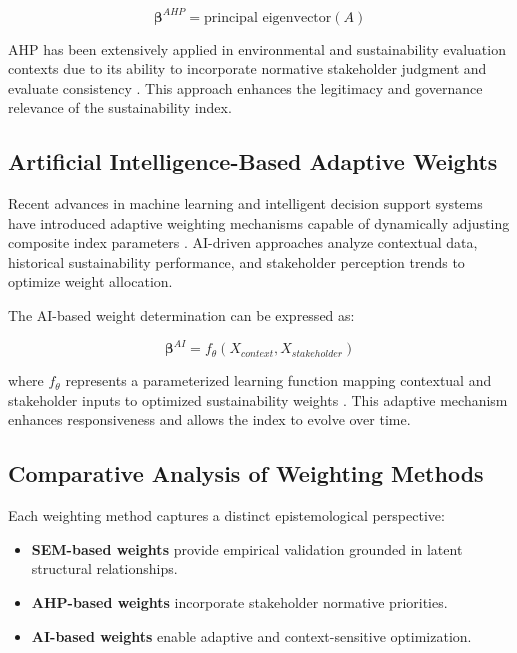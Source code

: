 \documentclass[11pt,a4paper]{article}
\begin{document}
\begin{equation}
\boldsymbol{\beta}^{AHP} = \text{principal eigenvector}(A)
\end{equation}

AHP has been extensively applied in environmental and sustainability evaluation contexts due to its ability to incorporate normative stakeholder judgment and evaluate consistency \cite{Cinelli2014,Mardani2015}. This approach enhances the legitimacy and governance relevance of the sustainability index.

\subsection{Artificial Intelligence-Based Adaptive Weights}

Recent advances in machine learning and intelligent decision support systems have introduced adaptive weighting mechanisms capable of dynamically adjusting composite index parameters \cite{Jordan2015,Goodfellow2016,Lu2019}. AI-driven approaches analyze contextual data, historical sustainability performance, and stakeholder perception trends to optimize weight allocation.

The AI-based weight determination can be expressed as:

\begin{equation}
\boldsymbol{\beta}^{AI} = f_{\theta}(X_{context}, X_{stakeholder})
\end{equation}

where $f_{\theta}$ represents a parameterized learning function mapping contextual and stakeholder inputs to optimized sustainability weights \cite{HerreraViedma2007,Yu2015}. This adaptive mechanism enhances responsiveness and allows the index to evolve over time.

\subsection{Comparative Analysis of Weighting Methods}

Each weighting method captures a distinct epistemological perspective:

\begin{itemize}
\item \textbf{SEM-based weights} provide empirical validation grounded in latent structural relationships.
\item \textbf{AHP-based weights} incorporate stakeholder normative priorities.
\item \textbf{AI-based weights} enable adaptive and context-sensitive optimization.
\end{itemize}
\end{document}
